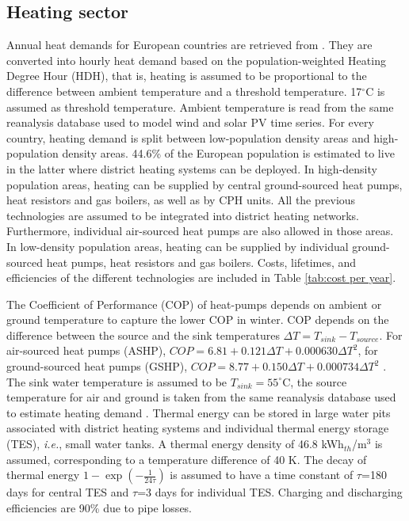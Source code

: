 \documentclass[3p]{elsarticle} %
\begin{document}
\subsection{Heating sector}

Annual heat demands for European countries are retrieved from \cite{HRE}. They are converted into hourly heat demand based on the population-weighted \cite{NUTS3} Heating Degree Hour (HDH), that is, heating is assumed to be proportional to the difference between ambient temperature and a threshold temperature. 17$^{\circ}$C is assumed as threshold temperature. Ambient temperature is read from the same reanalysis database \cite{CFSR} used to model wind and solar PV time series. For every country, heating demand is split between low-population density areas and high-population density areas. 44.6\%  of the European population is estimated to live in the latter \cite{Brown_2018} where district heating systems can be deployed. In high-density population areas, heating can be supplied by central ground-sourced heat pumps, heat resistors and gas boilers, as well as by CPH units. All the previous technologies are assumed to be integrated into district heating networks. Furthermore, individual air-sourced heat pumps are also allowed in those areas. In low-density population areas, heating can be supplied by individual ground-sourced heat pumps, heat resistors and gas boilers. Costs, lifetimes, and efficiencies of the different technologies are included in Table \ref{tab:cost per year}. \

The Coefficient of Performance (COP) of heat-pumps depends on ambient or ground temperature to capture the lower COP in winter. COP depends on the difference between the source and the sink temperatures $\Delta T = T_{sink}-T_{source}$. For air-sourced heat pumps (ASHP), $COP= 6.81 + 0.121 \Delta T +  0.000630 \Delta T^2$, for ground-sourced heat pumps (GSHP), $COP=8.77 + 0.150 \Delta T + 0.000734 \Delta T^2$ \cite{Staffell_2012}. The sink water temperature is assumed to be $T_{sink}=55^{\circ}$C, the source temperature for air and ground is taken from the same reanalysis database used to estimate heating demand \cite{CFSR}. Thermal energy can be stored in large water pits associated with district heating systems and individual thermal energy storage (TES), \textit{i.e.}, small water tanks.  A thermal energy density of 46.8 kWh$_{th}$/m$^3$ is assumed, corresponding to a temperature difference of 40 K. The decay of thermal energy $1 - \exp(- \frac{1}{24 \tau})$ is assumed to have a time constant of $\tau$=180 days for central TES and $\tau$=3 days for individual TES. Charging and discharging efficiencies are 90\% due to pipe losses.\\
\end{document}
